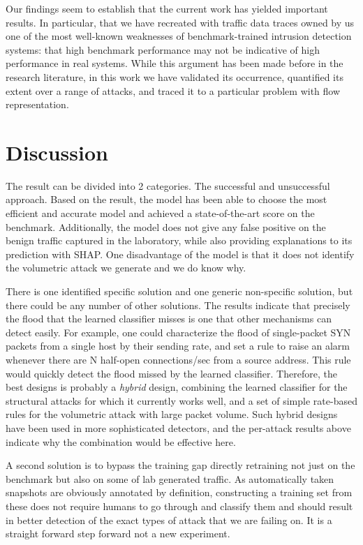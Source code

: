 Our findings seem to establish that the current work has yielded important results. In particular, that we have recreated with traffic data traces owned by us one of the most well-known weaknesses of benchmark-trained intrusion detection systems: that high benchmark performance may not be indicative of high performance in real systems. While this argument has been made before in the research literature, in this work we have validated its occurrence, quantified its extent over a range of attacks, and traced it to a particular problem with flow representation.

\section{Discussion}
\label{sec:results_discussion}

The result can be divided into 2 categories. The successful and unsuccessful approach. Based on the result, the model has been able to choose the most efficient and accurate model and achieved a state-of-the-art score on the benchmark.
Additionally, the model does not give any false positive on the benign traffic captured in the laboratory, while also providing explanations to its prediction with SHAP.
One disadvantage of the model is that it does not identify the volumetric attack we generate and we do know why.

There is one identified specific solution and one generic non-specific solution, but there could be any number of other solutions. The results indicate that precisely the flood that the learned classifier misses is one that other mechanisms can detect easily. For example, one could characterize the flood of single-packet SYN packets from a single host by their sending rate, and set a rule to raise an alarm whenever there are N half-open connections/sec from a source address.
This rule would quickly detect the flood missed by the learned classifier.
Therefore, the best designs is probably a \emph{hybrid} design, combining the learned classifier for the structural attacks for which it currently works well, and a set of simple rate-based rules for the volumetric attack with large packet volume. Such hybrid designs have been used in more sophisticated detectors, and the per-attack results above indicate why the combination would be effective here.

A second solution is to bypass the training gap directly retraining not just on the benchmark but also on some of lab generated traffic. As automatically taken snapshots are obviously annotated by definition, constructing a training set from these does not require humans to go through and classify them and should result in better detection of the exact types of attack that we are failing on. It is a straight forward step forward not a new experiment.

